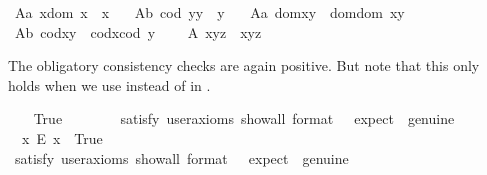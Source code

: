 \begin{isabellebody}
\ A{}a{\isacharcolon}\ {\isachardoublequoteopen}x{\isasymcdot}{\isacharparenleft}dom\ x{\isacharparenright}\ {\isasymcong}\ x{\isachardoublequoteclose}\ \ \isanewline
\ A{}b{\isacharcolon}\ {\isachardoublequoteopen}{\isacharparenleft}cod\ y{\isacharparenright}{\isasymcdot}y\ {\isasymcong}\ y{\isachardoublequoteclose}\ \ \isanewline
\ A{}a{\isacharcolon}\ {\isachardoublequoteopen}dom{\isacharparenleft}x{\isasymcdot}y{\isacharparenright}\ {\isasymcong}\ dom{\isacharparenleft}{\isacharparenleft}dom\ x{\isacharparenright}{\isasymcdot}y{\isacharparenright}{\isachardoublequoteclose}\ \ \isanewline
\ A{}b{\isacharcolon}\ {\isachardoublequoteopen}cod{\isacharparenleft}x{\isasymcdot}y{\isacharparenright}\ {\isasymcong}\ cod{\isacharparenleft}x{\isasymcdot}{\isacharparenleft}cod\ y{\isacharparenright}{\isacharparenright}{\isachardoublequoteclose}\ \ \isanewline
\ \ A{}{\isacharcolon}\ {\isachardoublequoteopen}x{\isasymcdot}{\isacharparenleft}y{\isasymcdot}z{\isacharparenright}\ {\isasymcong}\ {\isacharparenleft}x{\isasymcdot}y{\isacharparenright}{\isasymcdot}z{\isachardoublequoteclose}%
\begin{isamarkuptext}%
The obligatory consistency checks are again positive. 
 But note that this only holds when we use \isa{{\isasymsimeq}} instead of  \isa{{\isasymcong}} in  .%
\end{isamarkuptext}\isamarkuptrue%
\ \ \isamarkupfalse%
\ True\ \ %
\isanewline
\ \ \ \ \isamarkupfalse%
\ {\isacharbrackleft}satisfy{\isacharcomma}\ user{\isacharunderscore}axioms{\isacharcomma}\ show{\isacharunderscore}all{\isacharcomma}\ format\ {\isacharequal}\ {}{\isacharcomma}\ expect\ {\isacharequal}\ genuine{\isacharbrackright}%
\isadelimproof
\ %
\endisadelimproof
%
\isatagproof
{}\isamarkupfalse%
%
\endisatagproof
{\isafoldproof}%
%
\isadelimproof
%
\endisadelimproof
\isanewline
\ \ \isamarkupfalse%
\ \ {\isachardoublequoteopen}{\isasymexists}x{\isachardot}\ \isactrlbold {\isasymnot}{\isacharparenleft}E\ x{\isacharparenright}{\isachardoublequoteclose}\ \ True\ \ \ %
\ \ \isanewline
\ \ \ \ \isamarkupfalse%
\ {\isacharbrackleft}satisfy{\isacharcomma}\ user{\isacharunderscore}axioms{\isacharcomma}\ show{\isacharunderscore}all{\isacharcomma}\ format\ {\isacharequal}\ {}{\isacharcomma}\ expect\ {\isacharequal}\ genuine{\isacharbrackright}%

\end{isabellebody}
